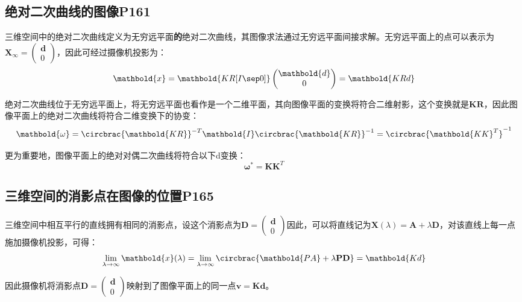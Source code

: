 \documentclass[11pt]{article}
\begin{document}
\subsection{绝对二次曲线的图像P161}
三维空间中的绝对二次曲线定义为无穷远平面\textbf{的}绝对二次曲线，其图像求法通过无穷远平面间接求解。无穷远平面上的点可以表示为$\mathbold{X}_\infty=\begin{pmatrix}
    \mathbold{d} \\ 0
  \end{pmatrix}$，因此可经过摄像机投影为：
\begin{equation*}
  \mathbold{x}=\mathbold{KR[I\sep 0]}\begin{pmatrix}
    \mathbold{d} \\ 0
  \end{pmatrix}=\mathbold{KRd}
\end{equation*}\par
绝对二次曲线位于无穷远平面上，将无穷远平面也看作是一个二维平面，其向图像平面的变换将符合二维射影，这个变换就是$\mathbold{KR}$，因此图像平面上的绝对二次曲线将符合二维变换下的协变：
\begin{equation*}
  \mathbold{\omega}=\circbrac{\mathbold{KR}}^{-T}\mathbold{I}\circbrac{\mathbold{KR}}^{-1}=\circbrac{\mathbold{KK}^T}^{-1}
\end{equation*}\par
更为重要地，图像平面上的绝对对偶二次曲线将符合以下d变换：
\begin{equation*}
  \mathbold{\omega}^*=\mathbold{KK}^T
\end{equation*}\par
\subsection{三维空间的消影点在图像的位置P165}
三维空间中相互平行的直线拥有相同的消影点，设这个消影点为$\mathbf{D}=\begin{pmatrix}
    \mathbold{d} \\ 0
  \end{pmatrix}$因此，可以将直线记为$\mathbold{X}(\lambda)=\mathbold{A}+\lambda\mathbf{D}$，对该直线上每一点施加摄像机投影，可得：
\begin{equation*}
  \lim_{\lambda\to\infty}\mathbold{x}(\lambda)=\lim_{\lambda\to\infty}\circbrac{\mathbold{PA}+\lambda\mathbf{PD}}=\mathbold{Kd}
\end{equation*}\par
因此摄像机将消影点$\mathbf{D}=\begin{pmatrix}
    \mathbold{d} \\ 0
  \end{pmatrix}$映射到了图像平面上的同一点$\mathbold{v=Kd}$。
\end{document}
